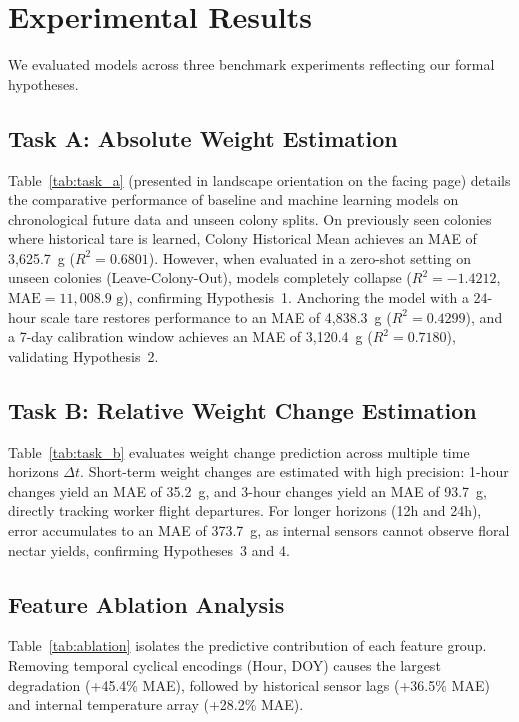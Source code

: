 \documentclass[10pt,twocolumn]{article}
\begin{document}
\section{Experimental Results}
We evaluated models across three benchmark experiments reflecting our formal hypotheses.

\subsection{Task A: Absolute Weight Estimation}
Table~\ref{tab:task_a} (presented in landscape orientation on the facing page) details the comparative performance of baseline and machine learning models on chronological future data and unseen colony splits. On previously seen colonies where historical tare is learned, Colony Historical Mean achieves an MAE of 3,625.7~g ($R^2 = 0.6801$). However, when evaluated in a zero-shot setting on unseen colonies (Leave-Colony-Out), models completely collapse ($R^2 = -1.4212$, $\text{MAE} = 11,008.9\text{ g}$), confirming Hypothesis~1. Anchoring the model with a 24-hour scale tare restores performance to an MAE of 4,838.3~g ($R^2 = 0.4299$), and a 7-day calibration window achieves an MAE of 3,120.4~g ($R^2 = 0.7180$), validating Hypothesis~2.

\subsection{Task B: Relative Weight Change Estimation}
Table~\ref{tab:task_b} evaluates weight change prediction across multiple time horizons $\Delta t$. Short-term weight changes are estimated with high precision: 1-hour changes yield an MAE of 35.2~g, and 3-hour changes yield an MAE of 93.7~g, directly tracking worker flight departures. For longer horizons (12h and 24h), error accumulates to an MAE of 373.7~g, as internal sensors cannot observe floral nectar yields, confirming Hypotheses~3 and 4.

\subsection{Feature Ablation Analysis}
Table~\ref{tab:ablation} isolates the predictive contribution of each feature group. Removing temporal cyclical encodings (Hour, DOY) causes the largest degradation (+45.4\% MAE), followed by historical sensor lags (+36.5\% MAE) and internal temperature array (+28.2\% MAE).
\end{document}
